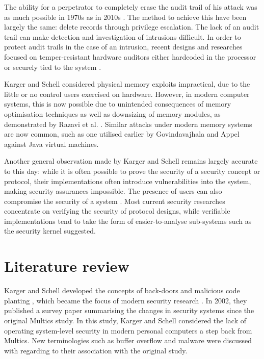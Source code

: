 \documentclass[11pt]{article}
\begin{document}
The ability for a perpetrator to completely erase the audit trail of his attack was as much possible in 1970s \cite[3.4.4]{karger1974multics} as in 2010s \cite[VI. C.]{koscher2010experimental}. The method to achieve this have been largely the same: delete records through privilege escalation. The lack of an audit trail can make detection and investigation of intrusions difficult. In order to protect audit trails in the case of an intrusion, recent designs and researches focused on temper-resistant hardware auditors either hardcoded in the processor \cite{bordsen1993cache} or securely tied to the system \cite{chong2003secure}.

Karger and Schell considered physical memory exploits impractical, due to the little or no control users exercised on hardware. However, in modern computer systems, this is now possible due to unintended consequences of memory optimisation techniques as well as downsizing of memory modules, as demonstrated by Razavi et al. \cite{razavi2016flip}. Similar attacks under modern memory systems are now common, such as one utilised earlier by Govindavajhala and Appel \cite{govindavajhala2003using} against Java virtual machines.

Another general observation made by Karger and Schell \cite[3.3.1]{karger1974multics} remains largely accurate to this day: while it is often possible to prove the security of a security concept or protocol, their implementations often introduce vulnerabilities into the system, making security assurances impossible. The presence of users can also compromise the security of a system \cite{adams1999users}. Most current security researches concentrate on verifying the security of protocol designs, while verifiable implementations tend to take the form of easier-to-analyse sub-systems such as the security kernel suggested.

\section{Literature review}

Karger and Schell \cite{karger1974multics} developed the concepts of back-doors and malicious code planting \cite[Sec. 2]{bell2005looking}, which became the focus of modern security research \cite{egele2012survey}. In 2002, they published a survey paper \cite{karger2002thirty} summarising the changes in security systems since the original Multics study. In this study, Karger and Schell considered the lack of operating system-level security in modern personal computers a step back from Multics. New terminologies such as buffer overflow and malware were discussed with regarding to their association with the original study. 
\end{document}
